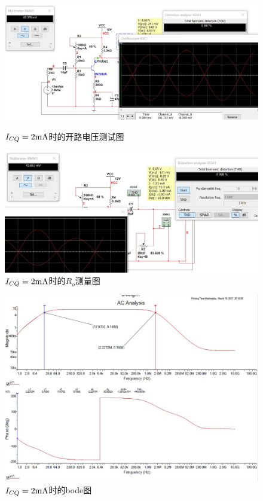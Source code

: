 \documentclass[UTF8,a4paper]{ctexart}
\begin{document}
\begin{figure}
\centering
\includegraphics[width=\textwidth]{spero1.JPG}
\caption{$I_{CQ}=2\rm{mA}$时的开路电压测试图}
\label{RERO1}
\includegraphics[width=\textwidth]{spero2.JPG}
\caption{$I_{CQ}=2\rm{mA}$时的$R_o$测量图}
\label{RERO2}
\end{figure}
\begin{figure}
\centering
\includegraphics[width=\textwidth]{TB.JPG}
\caption{$I_{CQ}=2\rm{mA}$时的bode图}
\label{REbode}
\end{figure}
\end{document}
